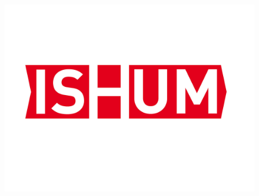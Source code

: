 


	
	
%
%

\begin{titlepage}
\begin{figure}
    \begin{minipage}{0.2\textwidth}
        \begin{flushleft}    
            \includegraphics[scale=0.25]{csm_ISUM_Logo_Final_107dd2fa79.jpg}
        \end{flushleft}
    \end{minipage}  
    \begin{minipage}{0.55\textwidth}
        \centering
        \hspace{0.25cm}
    \end{minipage}
    \begin{minipage}{0.2\textwidth}
        \begin{flushleft}   

\end{flushleft}
\end{minipage}
\end{figure}
\end{titlepage}

